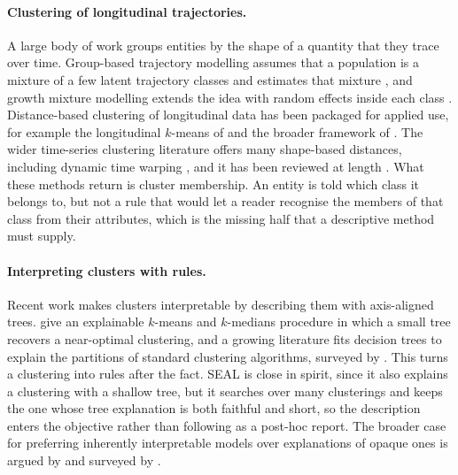 \paragraph{Clustering of longitudinal trajectories.} A large body of work groups entities by the shape of a quantity that they trace over time. Group-based trajectory modelling assumes that a population is a mixture of a few latent trajectory classes and estimates that mixture \citep{nagin2005group,nagin2010group}, and growth mixture modelling extends the idea with random effects inside each class \citep{muthen1999finite}. Distance-based clustering of longitudinal data has been packaged for applied use, for example the longitudinal $k$-means of \citet{genolini2010kml} and the broader framework of \citet{denteuling2023latrend}. The wider time-series clustering literature offers many shape-based distances, including dynamic time warping \citep{berndt1994dtw}, and it has been reviewed at length \citep{aghabozorgi2015timeseries}. What these methods return is cluster membership. An entity is told which class it belongs to, but not a rule that would let a reader recognise the members of that class from their attributes, which is the missing half that a descriptive method must supply.

\paragraph{Interpreting clusters with rules.} Recent work makes clusters interpretable by describing them with axis-aligned trees. \citet{dasgupta2020explainable} give an explainable $k$-means and $k$-medians procedure in which a small tree recovers a near-optimal clustering, and a growing literature fits decision trees to explain the partitions of standard clustering algorithms, surveyed by \citet{hongfei2024interpretableclustering}. This turns a clustering into rules after the fact. SEAL is close in spirit, since it also explains a clustering with a shallow tree, but it searches over many clusterings and keeps the one whose tree explanation is both faithful and short, so the description enters the objective rather than following as a post-hoc report. The broader case for preferring inherently interpretable models over explanations of opaque ones is argued by \citet{rudin2019stop} and surveyed by \citet{molnar2022interpretable}.

